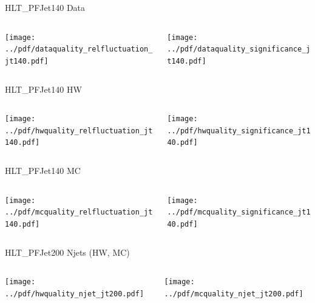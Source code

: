 \documentclass[9pt]{beamer}
\begin{document}
\begin{frame}[t]{HLT\_PFJet140 Data}
\begin{columns}[T]
  \begin{column}{.5\textwidth}
  \texttt{[image: ../pdf/dataquality\_relfluctuation\_jt140.pdf]}
  \end{column}
  \begin{column}{.5\textwidth}
  \texttt{[image: ../pdf/dataquality\_significance\_jt140.pdf]}
  \end{column}
\end{columns}
\end{frame}

\begin{frame}[t]{HLT\_PFJet140 HW}
\begin{columns}[T]
  \begin{column}{.5\textwidth}
  \texttt{[image: ../pdf/hwquality\_relfluctuation\_jt140.pdf]}
  \end{column}
  \begin{column}{.5\textwidth}
  \texttt{[image: ../pdf/hwquality\_significance\_jt140.pdf]}
  \end{column}
\end{columns}
\end{frame}

\begin{frame}[t]{HLT\_PFJet140 MC}
\begin{columns}[T]
  \begin{column}{.5\textwidth}
  \texttt{[image: ../pdf/mcquality\_relfluctuation\_jt140.pdf]}
  \end{column}
  \begin{column}{.5\textwidth}
  \texttt{[image: ../pdf/mcquality\_significance\_jt140.pdf]}
  \end{column}
\end{columns}
\end{frame}

\begin{frame}[t]{HLT\_PFJet200 Njets (HW, MC)}
\begin{columns}[T]
  \begin{column}{.5\textwidth}
  \texttt{[image: ../pdf/hwquality\_njet\_jt200.pdf]}
  \end{column}
  \begin{column}{.5\textwidth}
  \texttt{[image: ../pdf/mcquality\_njet\_jt200.pdf]}
  \end{column}
\end{columns}
\end{frame}
\end{document}
